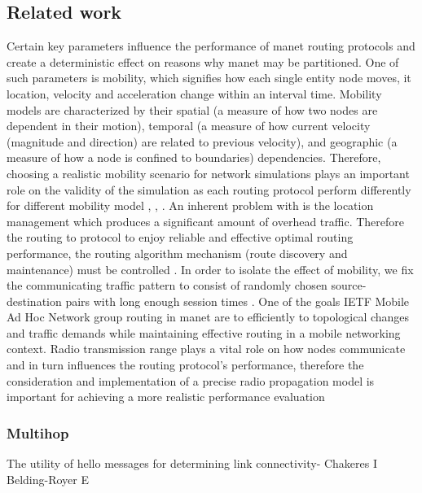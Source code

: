 \documentclass[letterpaper, 10 pt, conference]{ieeeconf}  %
\begin{document}
\subsection{Related work}


\cite{Bai2004ModelingProtocols} \cite{Bai2003IMPORTANT:NeTworks}
Certain key parameters influence the performance of manet routing protocols and create a deterministic effect on reasons why manet may be partitioned. One of such parameters is mobility, which signifies how each single entity node moves, it location, velocity and acceleration change within an interval time. Mobility models are characterized by their spatial (a measure of how two nodes are dependent in their motion), temporal (a measure of how current velocity (magnitude and direction) are related to previous velocity), and geographic (a measure of how a node is confined to boundaries) dependencies. Therefore, choosing a realistic mobility scenario for network simulations plays an important role on the validity of the simulation as each routing protocol perform differently for different mobility model \cite{Broch1998AProtocols}, \cite{Perkins2001PerformanceNetworks}, \cite{DasComparativeNetworks}. An inherent problem with is the location management which produces a significant amount of overhead traffic. Therefore the routing to protocol to enjoy reliable and effective optimal routing performance, the routing algorithm mechanism (route discovery and maintenance) must be controlled \cite{Online2004ANetworks}. In order to isolate the effect of mobility, we fix the communicating traffic pattern to consist of randomly chosen source-destination pairs with long enough session times \cite{Bai2003TheNeTworks}. One of the goals IETF Mobile Ad Hoc Network group routing in manet  are to efficiently to topological changes and traffic demands while maintaining effective routing in a mobile networking context.
Radio transmission range plays a vital role on how nodes communicate and in turn influences the routing protocol's performance, therefore the consideration and implementation of a precise radio propagation model is important for achieving a more realistic performance evaluation 

\subsubsection{Multihop}

The utility of hello messages for determining link connectivity- Chakeres I Belding-Royer E


\end{document}
